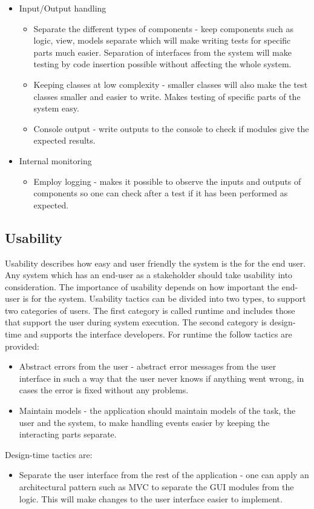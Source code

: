 \begin{itemize}
	\item Input/Output handling
        \begin{itemize}
	\item Separate the different types of components - keep components such as logic, view, models separate which will make writing tests for specific parts much easier. Separation of interfaces from the system will make testing by code insertion possible without affecting the whole system.
	\item Keeping classes at low complexity - smaller classes will also make the test classes smaller and easier to write. Makes testing of specific parts of the system easy.
	\item Console output - write outputs to the console to check if modules give the expected results.
	\end{itemize}
 
	\item Internal monitoring
        \begin{itemize}	
        \item Employ logging - makes it possible to observe the inputs and outputs of components so one can check after a test if it has been performed as expected.
        \end{itemize}
\end{itemize}


\subsection{Usability}
Usability describes how easy and user friendly the system is the for the end user. Any system which has an end-user as a stakeholder should take usability into consideration. The importance of usability depends on how important the end-user is for the system. Usability tactics can be divided into two types, to support two categories of users. The first category is called runtime and includes those that support the user during system execution. The second category is design-time and supports the interface developers.\cite{bass2003software} For runtime the follow tactics are provided:

\begin{itemize}
	\item Abstract errors from the user - abstract error messages from the user interface in such a way that the user never knows if anything went wrong, in cases the error is fixed without any problems.
	\item Maintain models - the application should maintain models of the task, the user and the system, to make handling events easier by keeping the interacting parts separate.
\end{itemize}

Design-time tactics are:

\begin{itemize}
	\item Separate the user interface from the rest of the application - one can apply an architectural pattern such as MVC to separate the GUI modules from the logic. This will make changes to the user interface easier to implement.
\end{itemize}

